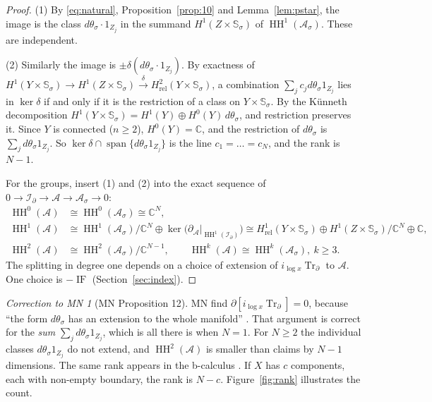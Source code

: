\documentclass[11pt,oneside,reqno]{article}
\DeclareMathOperator{\HH}{HH}
\DeclareMathOperator{\Tr}{Tr}
\DeclareMathOperator{\IF}{IF}
\newcommand{\C}{\mathbb C}
\newcommand{\cA}{\mathcal A}
\newcommand{\Id}{\mathcal I_\partial}
\newcommand{\As}{\mathcal A_\sigma}
\newcommand{\Trd}{\Tr_\partial}
\newcommand{\Ssig}{\mathbb S_\sigma}
\newcommand{\Hrel}{H_{\mathrm{rel}}}
\newcommand{\lx}{\log x}
\theoremstyle{plain}
\theoremstyle{definition}
\theoremstyle{remark}
\newtheorem{correction}[theorem]{Correction to MN}
\begin{document}
\begin{proof}
(1) By \eqref{eq:natural}, Proposition~\ref{prop:10} and
Lemma~\ref{lem:pstar}, the image is the class \(d\theta_\sigma\cdot
1_{Z_j}\) in the summand \(H^1(Z\times\Ssig)\) of \(\HH^1(\As)\). These are
independent.

(2) Similarly the image is \(\pm\delta(d\theta_\sigma\cdot1_{Z_j})\). By
exactness of \(H^1(Y\times\Ssig)\to H^1(Z\times\Ssig)\xrightarrow{\delta}
\Hrel^2(Y\times\Ssig)\), a combination \(\sum_jc_jd\theta_\sigma1_{Z_j}\)
lies in \(\ker\delta\) if and only if it is the restriction of a class on
\(Y\times\Ssig\). By the Künneth decomposition \(H^1(Y\times\Ssig)=
H^1(Y)\oplus H^0(Y)\,d\theta_\sigma\), and restriction preserves it.
Since \(Y\) is connected (\(n\ge2\)), \(H^0(Y)=\C\), and the restriction of
\(d\theta_\sigma\) is \(\sum_jd\theta_\sigma1_{Z_j}\). So
\(\ker\delta\cap\operatorname{span}\{d\theta_\sigma1_{Z_j}\}\) is the line
\(c_1=\dots=c_N\), and the rank is \(N-1\).

For the groups, insert (1) and (2) into the exact sequence of
\(0\to\Id\to\cA\to\As\to0\):
\begin{align*}
 \HH^0(\cA)&\cong\HH^0(\As)\cong\C^N,\\
 \HH^1(\cA)&\cong\HH^1(\As)/\C^N\oplus\ker\bigl(\partial_{\cA}|_{\HH^1(\Id)}\bigr)
 \cong\Hrel^1(Y\times\Ssig)\oplus H^1(Z\times\Ssig)/\C^N\oplus\C,\\
 \HH^2(\cA)&\cong\HH^2(\As)/\C^{N-1},\qquad
 \HH^k(\cA)\cong\HH^k(\As),\ k\ge3 .
\end{align*}
The splitting in degree one depends on a choice of extension of
\(i_{\lx}\Trd\) to \(\cA\). One choice is \(-\IF\)
(Section~\ref{sec:index}).
\end{proof}

\begin{correction}[MN Proposition 12]\label{corr:Prop12}
MN find \(\partial[i_{\lx}\Trd]=0\), because ``the form
\(d\theta_\sigma\) has an extension to the whole manifold''
\cite[p.~27]{MN}. That argument is correct for the \emph{sum}
\(\sum_jd\theta_\sigma1_{Z_j}\), which is all there is when \(N=1\). For
\(N\ge2\) the individual classes \(d\theta_\sigma1_{Z_j}\) do not extend,
and \(\HH^2(\cA)\) is smaller than \cite[(16)]{MN} claims by
\(N-1\) dimensions. The same rank appears in the b-calculus
\cite[Remark ``Several boundary components'']{HHb}. If \(X\) has \(c\)
components, each with non-empty boundary, the rank is \(N-c\).
Figure~\ref{fig:rank} illustrates the count.
\end{correction}
\end{document}
